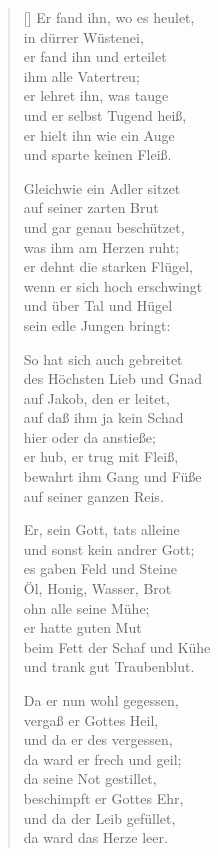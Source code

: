 \begin{multicols}{2}
\begin{verse}[\versewidth]
 Er fand ihn, wo es heulet,\\
in dürrer Wüstenei,\\
er fand ihn und erteilet\\
ihm alle Vatertreu;\\
er lehret ihn, was tauge\\
und er selbst Tugend heiß,\\
er hielt ihn wie ein Auge\\
und sparte keinen Fleiß.

 Gleichwie ein Adler sitzet\\
auf seiner zarten Brut\\
und gar genau beschützet,\\
was ihm am Herzen ruht;\\
er dehnt die starken Flügel,\\
wenn er sich hoch erschwingt\\
und über Tal und Hügel\\
sein edle Jungen bringt:

 So hat sich auch gebreitet\\
des Höchsten Lieb und Gnad\\
auf Jakob, den er leitet,\\
auf daß ihm ja kein Schad\\
hier oder da anstieße;\\
er hub, er trug mit Fleiß,\\
bewahrt ihm Gang und Füße\\
auf seiner ganzen Reis.

 Er, sein Gott, tats alleine\\
und sonst kein andrer Gott;\\
es gaben Feld und Steine\\
Öl, Honig, Wasser, Brot\\
ohn alle seine Mühe;\\
er hatte guten Mut\\
beim Fett der Schaf und Kühe\\
und trank gut Traubenblut.

 Da er nun wohl gegessen,\\
vergaß er Gottes Heil,\\
und da er des vergessen,\\
da ward er frech und geil;\\
da seine Not gestillet,\\
beschimpft er Gottes Ehr,\\
und da der Leib gefüllet,\\
da ward das Herze leer.


\end{verse}
\end{multicols}
